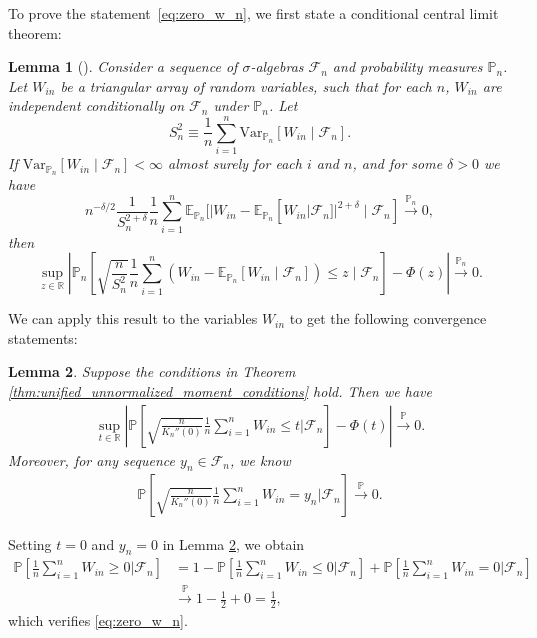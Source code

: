 \documentclass[12pt]{article}
\newtheorem{lemma}{Lemma}
\theoremstyle{definition}
\def\P{\mathbb{P}}
\def\P{\mathbb{P}}
\newcommand{\E}{\mathbb E}								%
\newcommand{\V}{\mathrm{Var}}							%
\renewcommand{\P}{\mathbb{P}}							%
\newcommand{\convp}{\overset{\mathbb{P}}{\rightarrow}}             %
\begin{document}
To prove the statement~\eqref{eq:zero_w_n}, we first state a conditional central limit theorem:
\begin{lemma}[\cite{Niu2022a}] \label{lem:conditional-clt}
	Consider a sequence of $\sigma$-algebras $\mathcal F_n$ and probability measures $\P_n$. Let $W_{in}$ be a triangular array of random variables, such that for each $n$, $W_{in}$ are independent conditionally on $\mathcal F_n$ under $\P_n$. Let
	\begin{equation*}
		S_n^2 \equiv \frac1n\sum_{i = 1}^n \V_{\P_n}[W_{in} \mid \mathcal F_n].
	\end{equation*} 
	If $\V_{\P_n}[W_{in} \mid \mathcal F_n] < \infty$ almost surely for each $i$ and $n$, and for some $\delta > 0$ we have
	\begin{equation}
		n^{-\delta/2}\frac{1}{S_n^{2+\delta}} \frac{1}{n}\sum_{i = 1}^n \E_{\P_n}[|W_{in}-\E_{\P_n}[W_{in}|\mathcal{F}_n]|^{2+\delta} \mid \mathcal{F}_n] \overset{\P_n} \rightarrow 0,
	\end{equation}
	then 
	\begin{equation*}
		\sup_{z\in\mathbb{R}}\left|\P_n\left[\sqrt{\frac{n}{S^2_n}} \frac1n\sum_{i = 1}^n (W_{in} - \E_{\P_n}[W_{in} \mid \mathcal{F}_n])\leq z \mid \mathcal F_n\right]-\Phi(z)\right| \overset{\P_n} \rightarrow 0.
	\end{equation*}
\end{lemma}
\noindent We can apply this result to the variables $W_{in}$ to get the following convergence statements:
\begin{lemma}\label{lem:conditional_CLT_W_n}
	Suppose the conditions in Theorem \ref{thm:unified_unnormalized_moment_conditions} hold. Then we have 
	\begin{align}\label{eq:conditional_uniform_CLT}
		\sup_{t\in\mathbb{R}}\left|\P\left[\sqrt{\frac{n}{K_n''(0)}}\frac1n\sum_{i=1}^n W_{in}\leq t|\mathcal{F}_n\right]-\Phi(t)\right|\convp 0.
	\end{align}
	Moreover, for any sequence $y_n\in\mathcal{F}_n$, we know 
	\begin{align}\label{eq:nondegeneracy}
		\P\left[\sqrt{\frac{n}{K_n''(0)}}\frac1n\sum_{i=1}^n W_{in}=y_n|\mathcal{F}_n\right]\convp 0.
	\end{align}
\end{lemma}
\noindent Setting $t=0$ and $y_n=0$ in Lemma \ref{lem:conditional_CLT_W_n}, we obtain 
\begin{equation*}
\begin{split}
	\P\left[\frac{1}{n}\sum_{i=1}^n W_{in}\geq  0|\mathcal{F}_n\right] &= 1 - \P\left[\frac{1}{n}\sum_{i=1}^n W_{in} \leq 0|\mathcal{F}_n\right] + \P\left[\frac{1}{n}\sum_{i=1}^n W_{in} = 0|\mathcal{F}_n\right] \\
	&\convp 1 - \frac{1}{2} + 0 = \frac12,
\end{split}
\end{equation*}
which verifies \eqref{eq:zero_w_n}. 
\end{document}
